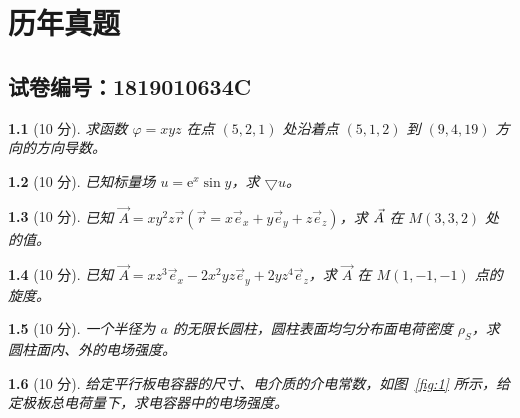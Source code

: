 \documentclass{book}
\theoremstyle{change}
\newtheorem{ti}{}[section]
\let\div\relax\let\grad\relax
\DeclareMathOperator{\div}{div}
\DeclareMathOperator{\grad}{grad}
\def\ee{\mathrm{e}}
\begin{document}
\chapter{历年真题}
\section{试卷编号：1819010634C}
\begin{ti}[10 分]
	求函数 $\varphi=xyz$ 在点 $(5,2,1)$ 处沿着点 $(5,1,2)$ 到 $(9,4,19)$ 方向的方向导数。
\end{ti}

\begin{ti}[10 分]
	已知标量场 $u=\ee ^x\sin y$，求 $\bigtriangledown u$。
\end{ti}

\begin{ti}[10 分]
	已知 $\vec{A}=xy^2z\vec{r}(\vec{r}=x\vec{e}_x+y\vec{e}_y+z\vec{e}_z)$，求 $\div \vec{A}$ 在 $M(3,3,2)$ 处的值。
\end{ti}

\begin{ti}[10 分]
	已知 $\vec{A}=xz^3\vec{e}_x-2x^2yz\vec{e}_y+2yz^4\vec{e}_z$，求 $\vec{A}$ 在 $M(1,-1,-1)$ 点的旋度。
\end{ti}

\begin{ti}[10 分]
	一个半径为 $a$ 的无限长圆柱，圆柱表面均匀分布面电荷密度 $\rho_S$，求圆柱面内、外的电场强度。
\end{ti}

\begin{ti}[10 分]
	给定平行板电容器的尺寸、电介质的介电常数，如图~\ref{fig:1} 所示，给定极板总电荷量下，求电容器中的电场强度。
\end{ti}
\end{document}
